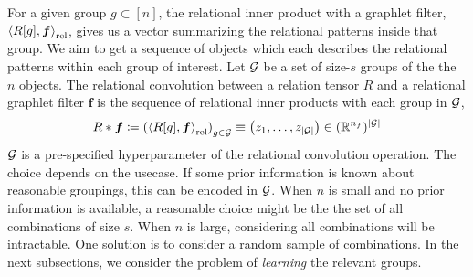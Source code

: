 For a given group $g \subset [n]$, the relational inner product with a graphlet filter, $\left \langle R[g], \bm{f} \right\rangle_\mathrm{rel}$, gives us a vector summarizing the relational patterns inside that group. We aim to get a sequence of objects which each describes the relational patterns within each group of interest. Let ${\mathcal{G}}$ be a set of size-$s$ groups of the the $n$ objects. The relational convolution between a relation tensor $R$ and a relational graphlet filter $\bm{f}$ is the sequence of relational inner products with each group in ${\mathcal{G}}$,
\begin{equation}
    \label{eq:relational_convolution}
    R \ast \bm{f} \coloneq \left( \left\langle R[g], \boldsymbol{f} \right\rangle_\mathrm{rel} \right)_{g \in {\mathcal{G}}} \equiv \left(z_1, \ldots, z_{\left\lvert{\mathcal{G}}\right\rvert}\right) \in (\mathbb{R}^{n_f})^{\left\lvert{\mathcal{G}}\right\rvert}
\end{equation}
${\mathcal{G}}$ is a pre-specified hyperparameter of the relational convolution operation. The choice depends on the usecase. If some prior information is known about reasonable groupings, this can be encoded in ${\mathcal{G}}$. When $n$ is small and no prior information is available, a reasonable choice might be the the set of all combinations of size $s$. When $n$ is large, considering all combinations will be intractable. One solution is to consider a random sample of combinations. In the next subsections, we consider the problem of \textit{learning} the relevant groups.


